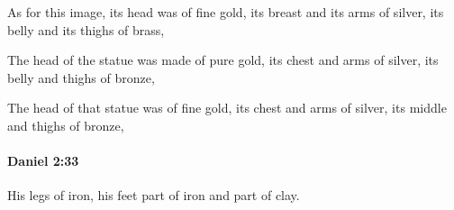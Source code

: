 			\begin{versebox}
					\item[BHS] 
					\item[LXX] 
					\item[ASV] As for this image, its head was of fine gold, its breast and its arms of silver, its belly and its thighs of brass,
					\item[NIV] The head of the statue was made of pure gold, its chest and arms of silver, its belly and thighs of bronze,
					\item[NRSV] The head of that statue was of fine gold, its chest and arms of silver, its middle and thighs of bronze,
			\end{versebox}

		\paragraph{Daniel 2:33} %
			\label{DANIEL-2-33}

			His legs of iron, his feet part of iron and part of clay.

